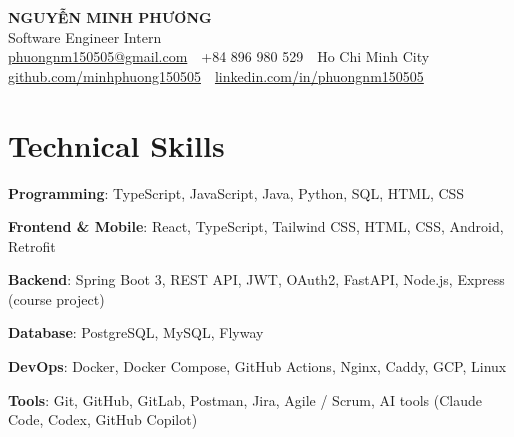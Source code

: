 \documentclass[10pt, a4paper]{article}
\newcommand{\skillrow}[2]{\textbf{#1}: #2\par}
\begin{document}
\color{BodyText}

\begin{center}
  {\fontsize{21pt}{25pt}\selectfont\bfseries\color{NavyBlue} NGUYỄN MINH PHƯƠNG}\\[3pt]
  {\fontsize{12.5pt}{15pt}\selectfont\color{MutedText} Software Engineer Intern}\\[4pt]
  {\footnotesize
  \href{mailto:phuongnm150505@gmail.com}{phuongnm150505@gmail.com}
  \,\textbar\, +84 896 980 529
  \,\textbar\, Ho Chi Minh City
  \,\textbar\, \href{https://github.com/minhphuong150505}{github.com/minhphuong150505}
  \,\textbar\, \href{https://www.linkedin.com/in/phuongnm150505/}{linkedin.com/in/phuongnm150505}}
\end{center}
\vspace{-6pt}

\section{Technical Skills}
\skillrow{Programming}{TypeScript, JavaScript, Java, Python, SQL, HTML, CSS}
\skillrow{Frontend \& Mobile}{React, TypeScript, Tailwind CSS, HTML, CSS, Android, Retrofit}
\skillrow{Backend}{Spring Boot 3, REST API, JWT, OAuth2, FastAPI, Node.js, Express (course project)}
\skillrow{Database}{PostgreSQL, MySQL, Flyway}
\skillrow{DevOps}{Docker, Docker Compose, GitHub Actions, Nginx, Caddy, GCP, Linux}
\skillrow{Tools}{Git, GitHub, GitLab, Postman, Jira, Agile / Scrum, AI tools (Claude Code, Codex, GitHub Copilot)}

\end{document}
